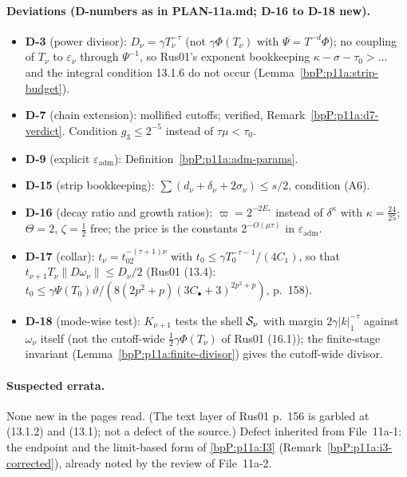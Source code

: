 \paragraph{Deviations (D-numbers as in PLAN-11a.md; D-16 to D-18 new).}
\begin{itemize}
\item \textbf{D-3} (power divisor): $D_\nu=\gamma T_\nu^{-\tau}$ (not $\gamma\Phi(T_\nu)$ with $\Psi=T^{-d}\Phi$); no coupling of $T_\nu$ to $\varepsilon_\nu$ through $\Psi^{-1}$, so Rus01's exponent bookkeeping $\kappa-\sigma-\tau_0>\ldots$ and the integral condition 13.1.6 do not occur (Lemma~\ref{bpP:p11a:strip-budget}).
\item \textbf{D-7} (chain extension): mollified cutoffs; verified, Remark~\ref{bpP:p11a:d7-verdict}. Condition $g_3\le2^{-5}$ instead of $\tau\mu<\tau_0$.
\item \textbf{D-9} (explicit $\varepsilon_{\mathrm{adm}}$): Definition~\ref{bpP:p11a:adm-params}.
\item \textbf{D-15} (strip bookkeeping): $\sum(d_\nu+\delta_\nu+2\sigma_\nu)\le s/2$, condition (A6).
\item \textbf{D-16} (decay ratio and growth ratios): $\varpi=2^{-2E_*}$ instead of $\delta^\kappa$ with $\kappa=\frac{24}{25}$; $\Theta=2$, $\zeta=\frac12$ free; the price is the constants $2^{-O(\mu\tau)}$ in $\varepsilon_{\mathrm{adm}}$.
\item \textbf{D-17} (collar): $t_\nu=t_02^{-(\tau+1)\nu}$ with $t_0\le\gamma T_0^{-\tau-1}/(4C_1)$, so that $t_{\nu+1}T_\nu\lVert D\omega_\nu\rVert\le D_\nu/2$ (Rus01 (13.4): $t_0\le\gamma\Psi(T_0)\vartheta/(8(2p^2+p)(3C_\bullet+3)^{2p^2+p})$, p.~158).
\item \textbf{D-18} (mode-wise test): $K_{\nu+1}$ tests the shell $\mathcal S_\nu$ with margin $2\gamma\lvert k\rvert_1^{-\tau}$ against $\omega_\nu$ itself (not the cutoff-wide $\frac12\gamma\Phi(T_\nu)$ of Rus01 (16.1)); the finite-stage invariant (Lemma~\ref{bpP:p11a:finite-divisor}) gives the cutoff-wide divisor.
\end{itemize}

\paragraph{Suspected errata.} None new in the pages read. (The text layer of Rus01 p.~156 is garbled at (13.1.2) and (13.1); not a defect of the source.) Defect inherited from File~11a-1: the endpoint and the limit-based form of \ref{bpP:p11a:I3} (Remark~\ref{bpP:p11a:i3-corrected}), already noted by the review of File~11a-2.

